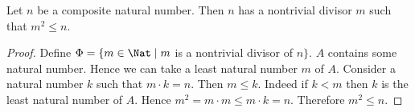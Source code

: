 \begin{forthel}
  \begin{proposition}
    Let $n$ be a composite natural number.
    Then $n$ has a nontrivial divisor $m$ such that $m^{2} \leq n$.
  \end{proposition}
  \begin{proof}
    Define $\Phi = \{ m \in \Nat \mid m$ is a nontrivial divisor of $n \}$.
    $A$ contains some natural number.
    Hence we can take a least natural number $m$ of $A$.
    Consider a natural number $k$ such that $m \cdot k = n$.
    Then $m \leq k$.
    Indeed if $k < m$ then $k$ is the least natural number of $A$.
    Hence $m^{2} = m \cdot m \leq m \cdot k = n$.
    Therefore $m^{2} \leq n$.
  \end{proof}
\end{forthel}

